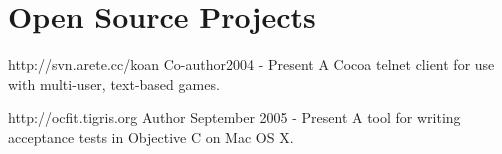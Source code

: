\documentclass{resume}
\begin{document}
\section{Open Source Projects}
\begin{itemize}
             {http://svn.arete.cc/koan}
             {Co-author}{2004 - Present}
             A Cocoa telnet client for use with multi-user, text-based games.

             {http://ocfit.tigris.org}
             {Author}
             {September 2005 - Present}
             A tool for writing acceptance tests in Objective C on Mac OS X.
\end{itemize}
\end{document}
